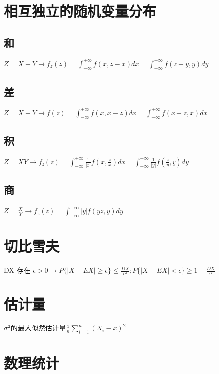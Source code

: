 \documentclass[UTF8]{ctexart}
\begin{document}
\section{相互独立的随机变量分布}
\subsection{和}
$Z=X+Y \longrightarrow f_z(z)=\int_{-\infty}^{+\infty}f(x,z-x)dx=\int_{-\infty}^{+\infty}f(z-y,y)dy$ \\
\subsection{差}
$Z=X-Y \longrightarrow f(z)=\int_{-\infty}^{+\infty}f(x,x-z)dx=\int_{-\infty}^{+\infty}f(x+z,x)dx$
\subsection{积}
$Z=XY \longrightarrow f_z(z) = \int_{-\infty}^{+\infty}
\frac{1}{|x|}
f(x,\frac{z}{x})
dx=
\int_{-\infty}^{+\infty}
\frac{1}{|y|}
f(\frac{z}{y},{y})
dy
$
\subsection{商}
$Z=\frac{X}{Y} \longrightarrow
f_z(z)=
\int_{-\infty}^{+\infty}
|y|
f(yz,y)
dy
$
\section{切比雪夫}
DX 存在
$\epsilon>0
\rightarrow P\{|X-EX|\geq \epsilon\}\leq\frac{DX}{\epsilon^2} ;
P\{|X-EX|< \epsilon\}\geq1-\frac{DX}{\epsilon^2}$
\section{估计量}
$\sigma^2$的最大似然估计量$\frac{1}{n}
\sum_{i=1}^n
{(X_i - \bar{x})}^2$

\section{数理统计}
\end{document}
